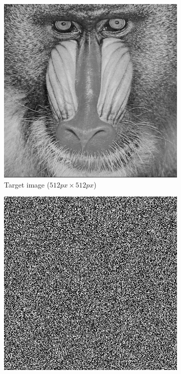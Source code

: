 \begin{figure}[H]
  \centering
  \begin{subfigure}[t]{0.3\textwidth}
    \centering
    \includegraphics[width=\textwidth]{mandrill.png}
    \caption{Target image ($512 px\times 512 px$)}
  \end{subfigure}
  \hfill
  \begin{subfigure}[t]{0.3\textwidth}
    \centering
    \includegraphics[width=\textwidth]{GS_holo_i_30.png}

\end{subfigure}
\end{figure}
